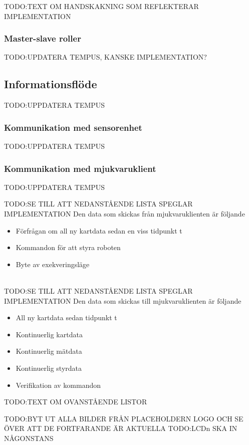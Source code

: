 \documentclass{article}
\begin{document}
TODO:TEXT OM HANDSKAKNING SOM REFLEKTERAR IMPLEMENTATION

\subsubsection{Master-slave roller}
\label{sec:bluetooth_master_slave}
TODO:UPDATERA TEMPUS, KANSKE IMPLEMENTATION?

\subsection{Informationsflöde}
TODO:UPPDATERA TEMPUS

\subsubsection{Kommunikation med sensorenhet}
TODO:UPPDATERA TEMPUS

\subsubsection{Kommunikation med mjukvaruklient}
TODO:UPPDATERA TEMPUS

TODO:SE TILL ATT NEDANSTÅENDE LISTA SPEGLAR IMPLEMENTATION
Den data som skickas från mjukvaruklienten är följande
\begin{itemize}
\item Förfrågan om all ny kartdata sedan en viss tidpunkt t
\item Kommandon för att styra roboten
\item Byte av exekveringsläge
\end{itemize}
\ \\

TODO:SE TILL ATT NEDANSTÅENDE LISTA SPEGLAR IMPLEMENTATION
Den data som skickas till mjukvaruklienten är följande
\begin{itemize}
\item All ny kartdata sedan tidpunkt t
\item Kontinuerlig kartdata
\item Kontinuerlig mätdata
\item Kontinuerlig styrdata
\item Verifikation av kommandon
\end{itemize}

TODO:TEXT OM OVANSTÅENDE LISTOR

\nocite{*}
{}


TODO:BYT UT ALLA BILDER FRÅN PLACEHOLDERN LOGO OCH SE ÖVER ATT DE FORTFARANDE ÄR AKTUELLA
TODO:LCDn SKA IN NÅGONSTANS
\end{document}
